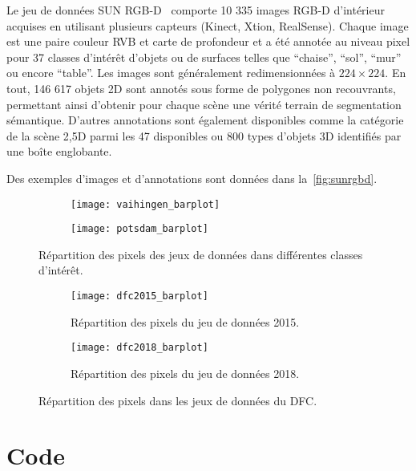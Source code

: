Le jeu de données SUN RGB-D~\cite{song_sun_2015} comporte 10 335 images \glsdesc{RGB-D} d'intérieur acquises en utilisant plusieurs capteurs (Kinect, Xtion, RealSense). Chaque image est une paire couleur \gls{RVB} et carte de profondeur et a été annotée au niveau pixel pour 37 classes d'intérêt d'objets ou de surfaces telles que ``chaise'', ``sol'', ``mur'' ou encore ``table''. Les images sont généralement redimensionnées à $224\times224$. En tout, 146 617 objets 2D sont annotés sous forme de polygones non recouvrants, permettant ainsi d'obtenir pour chaque scène une vérité terrain de segmentation sémantique. D'autres annotations sont également disponibles comme la catégorie de la scène 2,5D parmi les 47 disponibles ou 800 types d'objets 3D identifiés par une boîte englobante.

Des exemples d'images  et d'annotations sont données dans la~\cref{fig:sunrgbd}.

\begin{figure}[h]
	\begin{subfigure}{\textwidth}
		\texttt{[image: vaihingen\_barplot]}
	\end{subfigure}
	\begin{subfigure}{\textwidth}
		\texttt{[image: potsdam\_barplot]}
	\end{subfigure}
	\caption{Répartition des pixels des jeux de données  dans différentes classes d'intérêt.}
	\label{fig:isprs_barplots}
\end{figure}


\begin{figure}[h]
	\begin{subfigure}[t]{\textwidth}
		\texttt{[image: dfc2015\_barplot]}
		\caption{Répartition des pixels du jeu de données  2015.}
		\label{fig:dfc2015_barplot}
	\end{subfigure}
	\begin{subfigure}[t]{\textwidth}
		\texttt{[image: dfc2018\_barplot]}
		\caption{Répartition des pixels du jeu de données  2018.}
		\label{fig:dfc2018_barplot}
	\end{subfigure}
	\caption{Répartition des pixels dans les jeux de données du \glsdesc{DFC}.}
\end{figure}


%
%
\printbibliography

\chapter{Code}
